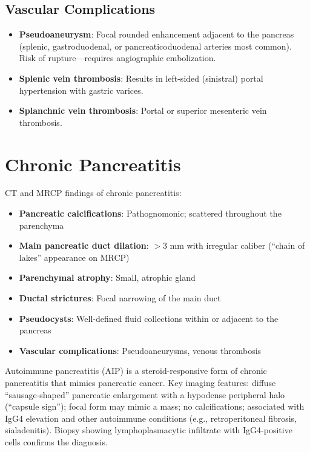 \subsection{Vascular Complications}
\begin{itemize}
  \item \textbf{Pseudoaneurysm}: Focal rounded enhancement adjacent to the pancreas (splenic, gastroduodenal, or pancreaticoduodenal arteries most common). Risk of rupture---requires angiographic embolization.
  \item \textbf{Splenic vein thrombosis}: Results in left-sided (sinistral) portal hypertension with gastric varices.
  \item \textbf{Splanchnic vein thrombosis}: Portal or superior mesenteric vein thrombosis.
\end{itemize}


\section{Chronic Pancreatitis}
CT and MRCP findings of chronic pancreatitis:
\begin{itemize}
  \item \textbf{Pancreatic calcifications}: Pathognomonic; scattered throughout the parenchyma
  \item \textbf{Main pancreatic duct dilation}: $> 3$ mm with irregular caliber (``chain of lakes'' appearance on MRCP)
  \item \textbf{Parenchymal atrophy}: Small, atrophic gland
  \item \textbf{Ductal strictures}: Focal narrowing of the main duct
  \item \textbf{Pseudocysts}: Well-defined fluid collections within or adjacent to the pancreas
  \item \textbf{Vascular complications}: Pseudoaneurysms, venous thrombosis
\end{itemize}

\begin{pearlbox}
Autoimmune pancreatitis (AIP) is a steroid-responsive form of chronic pancreatitis that mimics pancreatic cancer. Key imaging features: diffuse ``sausage-shaped'' pancreatic enlargement with a hypodense peripheral halo (``capsule sign''); focal form may mimic a mass; no calcifications; associated with IgG4 elevation and other autoimmune conditions (e.g., retroperitoneal fibrosis, sialadenitis). Biopsy showing lymphoplasmacytic infiltrate with IgG4-positive cells confirms the diagnosis.
\end{pearlbox}


